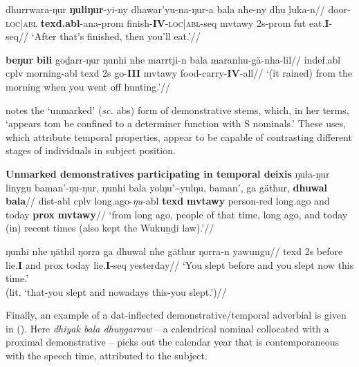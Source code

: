 \a{}\begingl\gla dhurrwara-ŋur \textbf{ŋuliŋur}-yi-ny dhawar'yu-na-ŋur-a bala nhe-ny dhu ḻuka-n//
\glb door-\textsc{loc|abl} \textbf{\gls{texd}.\gls{abl}}-\gls{ana}-\gls{prom} finish-\textbf{IV}-\textsc{loc|abl}-\gls{seq} \gls{mvtawy} 2s-\gls{prom} \gls{fut} eat.\textbf{I}-\gls{seq}//
\glft`After that's finished, then you'll eat.'//\endgl

\a\begingl\gla \textbf{beŋur} \textbf{bili} goḏarr-ŋur ŋunhi nhe marrtji-n bala maranhu-gä-nha-lil//
\glb \gls{indef}.\gls{abl} \gls{cplv} morning-\gls{abl} \gls{texd} 2s go-\textbf{III} \gls{mvtawy} food-carry-\textbf{IV}-\gls{all}//
\glft`(it rained) from the morning when you went off hunting.'//\endgl
\xe



\citet[258]{Wilkinson1991} notes the `unmarked' (\textit{sc. }\gls{abs}) form of demonstrative stems, which, in her terms, `appears tom be confined to a determiner function with S nominals.' These uses, which attribute temporal properties, appear to be capable of contrasting different stages of individuals in subject position.

\pex{}\textbf{Unmarked demonstratives participating in temporal deixis}
\a{}\begingl\gla ŋula-ŋur linygu baman'-ŋu-ŋur, ŋunhi bala yolŋu'\textasciitilde{yulŋu}, baman', ga gäthur, \textbf{dhuwal} \textbf{bala}//
\glb \gls{dist}-\gls{abl} \gls{cplv} long.ago-\textit{ŋu}-\gls{abl} \textbf{\gls{texd}} \textbf{\gls{mvtawy}} person-\gls{red} long.ago and today \textbf{\gls{prox}} \textbf{\gls{mvtawy}}//
\glft`from long ago, people of that time, long ago, and today (in) recent times (also kept the
Wukuṉḏi law).'//\endgl


\a{}\begingl\gla ŋunhi nhe ŋäthil ŋorra ga dhuwal nhe gäthur ŋorra-n yawungu//
\glb \gls{texd} 2s before lie.\textbf{I} and \gls{prox} today lie.\textbf{I}-\gls{seq} yesterday//
\glft`You slept before and you slept now this time.'\\(lit. `that-you slept and nowadays this-you slept.')//\endgl
\xe


Finally, an example of a \gls{dat}-inflected demonstrative/temporal adverbial is given in (\nextx). Here \textit{dhiyak bala dhuŋgarraw} -- a calendrical nominal collocated with a proximal demonstrative -- picks out the calendar year that is contemporaneous with the speech time, attributed to the subject.

